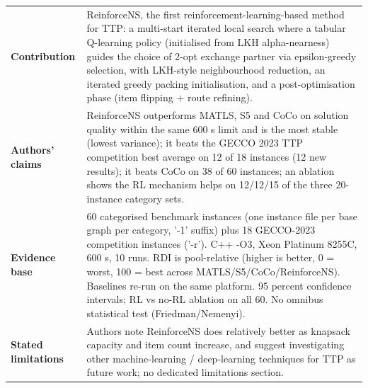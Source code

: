 \documentclass[
  a4paper,
  11pt,
  headings=small,
  numbers=noenddot,
  abstract=on,
  parskip=half,
]{scrartcl}
\begin{document}
\begin{landscape}
\begin{longtable}{@{}p{2.6cm}p{8.7cm}p{2.6cm}p{8.7cm}@{}}
\textbf{Contribution} & \multicolumn{3}{p{20.0cm}}{ReinforceNS, the first reinforcement-learning-based method for TTP: a multi-start iterated local search where a tabular Q-learning policy (initialised from LKH alpha-nearness) guides the choice of 2-opt exchange partner via epsilon-greedy selection, with LKH-style neighbourhood reduction, an iterated greedy packing initialisation, and a post-optimisation phase (item flipping + route refining).} \\
\textbf{Authors' claims} & \multicolumn{3}{p{20.0cm}}{ReinforceNS outperforms MATLS, S5 and CoCo on solution quality within the same 600 s limit and is the most stable (lowest variance); it beats the GECCO 2023 TTP competition best average on 12 of 18 instances (12 new results); it beats CoCo on 38 of 60 instances; an ablation shows the RL mechanism helps on 12/12/15 of the three 20-instance category sets.} \\
\textbf{Evidence base} & \multicolumn{3}{p{20.0cm}}{60 categorised benchmark instances (one instance file per base graph per category, '-1' suffix) plus 18 GECCO-2023 competition instances ('-r'). C++ -O3, Xeon Platinum 8255C, 600 s, 10 runs. RDI is pool-relative (higher is better, 0 = worst, 100 = best across MATLS/S5/CoCo/ReinforceNS). Baselines re-run on the same platform. 95 percent confidence intervals; RL vs no-RL ablation on all 60. No omnibus statistical test (Friedman/Nemenyi).} \\
\textbf{Stated limitations} & \multicolumn{3}{p{20.0cm}}{Authors note ReinforceNS does relatively better as knapsack capacity and item count increase, and suggest investigating other machine-learning / deep-learning techniques for TTP as future work; no dedicated limitations section.} \\

\end{longtable}
\end{landscape}
\end{document}
